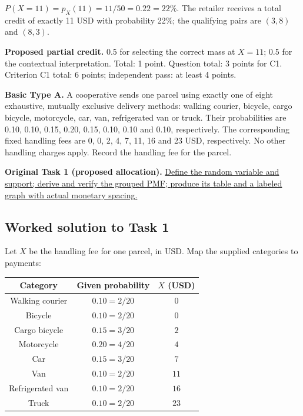 $P(X=11)=p_X(11)=11/50=0.22=22\%$. The retailer receives a total credit of exactly 11 USD with probability 22\%; the qualifying pairs are $(3,8)$ and $(8,3)$.

\textbf{Proposed partial credit.} 0.5 for selecting the correct mass at $X=11$; 0.5 for the contextual interpretation. Total: 1 point. Question total: 3 points for C1. Criterion C1 total: 6 points; independent pass: at least 4 points.

\par\vspace{3mm}\secInicio[][sec:q2]

\clearpage
{}

\textbf{Basic Type A.} A cooperative sends one parcel using exactly one of eight exhaustive, mutually exclusive delivery methods: walking courier, bicycle, cargo bicycle, motorcycle, car, van, refrigerated van or truck. Their probabilities are 0.10, 0.10, 0.15, 0.20, 0.15, 0.10, 0.10 and 0.10, respectively. The corresponding fixed handling fees are 0, 0, 2, 4, 7, 11, 16 and 23 USD, respectively. No other handling charges apply. Record the handling fee for the parcel.

\textbf{Original Task 1 (proposed allocation).} \hyperref[sol:q3t1]{Define the random variable and support; derive and verify the grouped PMF; produce its table and a labeled graph with actual monetary spacing.} 


\subsection*{Worked solution to Task 1 }
\label{sol:q3t1}

Let $X$ be the handling fee for one parcel, in USD. Map the supplied categories to payments:

\begin{center}
\begin{tabular}{ccc}\toprule
Category & Given probability & $X$ (USD)\\\midrule
Walking courier & $0.10=2/20$ & $0$\\
Bicycle & $0.10=2/20$ & $0$\\
Cargo bicycle & $0.15=3/20$ & $2$\\
Motorcycle & $0.20=4/20$ & $4$\\
Car & $0.15=3/20$ & $7$\\
Van & $0.10=2/20$ & $11$\\
Refrigerated van & $0.10=2/20$ & $16$\\
Truck & $0.10=2/20$ & $23$\\
\bottomrule\end{tabular}
\end{center}


